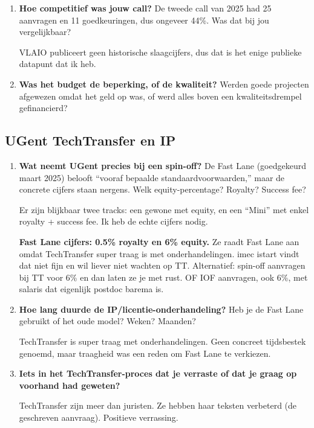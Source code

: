 \documentclass[11pt,a4paper]{article}
\newcommand{\notebox}{%
\begin{tcolorbox}[colback=notebg, colframe=noteborder, boxrule=0.5pt, arc=2pt, left=4pt, right=4pt, top=2pt, bottom=2pt]
\vspace{2.2cm}
\end{tcolorbox}
}
\newcommand{\filledbox}[1]{%
\begin{tcolorbox}[colback=notebg, colframe=noteborder, boxrule=0.5pt, arc=2pt, left=4pt, right=4pt, top=2pt, bottom=2pt]
#1
\end{tcolorbox}
}
\begin{document}
\begin{enumerate}[resume]

\item \textbf{Hoe competitief was jouw call?} De tweede call van 2025 had 25 aanvragen en 11 goedkeuringen, dus ongeveer 44\%. Was dat bij jou vergelijkbaar?

VLAIO publiceert geen historische slaagcijfers, dus dat is het enige publieke datapunt dat ik heb.

\notebox

\item \textbf{Was het budget de beperking, of de kwaliteit?} Werden goede projecten afgewezen omdat het geld op was, of werd alles boven een kwaliteitsdrempel gefinancierd?

\notebox

\end{enumerate}

\subsection{UGent TechTransfer en IP}

\begin{enumerate}[resume]

\item \textbf{Wat neemt UGent precies bij een spin-off?} De Fast Lane (goedgekeurd maart 2025) belooft ``vooraf bepaalde standaardvoorwaarden,'' maar de concrete cijfers staan nergens. Welk equity-percentage? Royalty? Success fee?

Er zijn blijkbaar twee tracks: een gewone met equity, en een ``Mini'' met enkel royalty + success fee. Ik heb de echte cijfers nodig.

\filledbox{\textbf{Fast Lane cijfers: 0.5\% royalty en 6\% equity.} Ze raadt Fast Lane aan omdat TechTransfer super traag is met onderhandelingen. imec istart vindt dat niet fijn en wil liever niet wachten op TT. Alternatief: spin-off aanvragen bij TT voor 6\% en dan laten ze je met rust. OF IOF aanvragen, ook 6\%, met salaris dat eigenlijk postdoc barema is.}

\item \textbf{Hoe lang duurde de IP/licentie-onderhandeling?} Heb je de Fast Lane gebruikt of het oude model? Weken? Maanden?

\filledbox{TechTransfer is super traag met onderhandelingen. Geen concreet tijdsbestek genoemd, maar traagheid was een reden om Fast Lane te verkiezen.}

\item \textbf{Iets in het TechTransfer-proces dat je verraste of dat je graag op voorhand had geweten?}

\filledbox{TechTransfer zijn meer dan juristen. Ze hebben haar teksten verbeterd (de geschreven aanvraag). Positieve verrassing.}

\end{enumerate}
\end{document}
